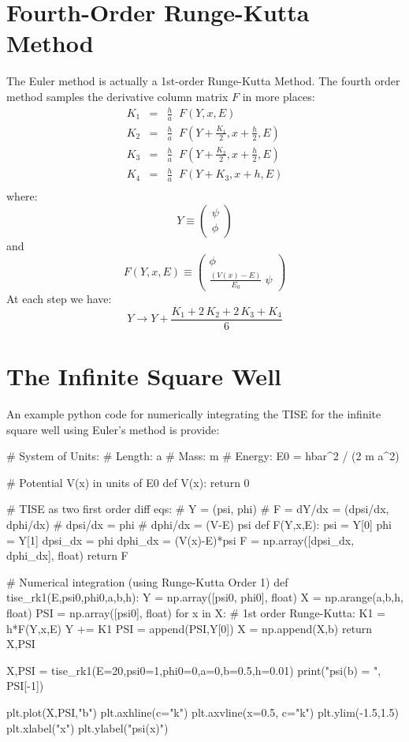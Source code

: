 \documentclass[12pt]{article}
\begin{document}
\section{Fourth-Order Runge-Kutta Method}
The Euler method is actually a 1st-order Runge-Kutta Method.  The fourth order method samples the derivative column matrix $F$ in more places:
\begin{eqnarray*}
K_1 &=& \frac{h}{a} \; \; F(Y, x, E) \\[5pt]
K_2 &=& \frac{h}{a} \; \; F\left(Y + \frac{K_1}{2}, x+\frac{h}{2}, E\right) \\[5pt]
K_3 &=& \frac{h}{a} \; \; F\left(Y + \frac{K_2}{2}, x+\frac{h}{2}, E\right) \\[5pt]
K_4 &=& \frac{h}{a} \; \; F(Y+K_3, x+h, E) \\
\end{eqnarray*}
where:
\begin{equation}
Y \equiv \begin{pmatrix} \psi \\ \phi \end{pmatrix}
\end{equation}
and
\begin{equation}
F(Y,x,E) \equiv \begin{pmatrix} \phi \\ \displaystyle \frac{(V(x)-E)}{E_0}\;\psi \end{pmatrix}
\end{equation}
At each step we have:
$$Y \to Y + \frac{K_1 + 2\,K_2 + 2\, K_3 + K_4}{6}$$

\section{The Infinite Square Well}
An example python code for numerically integrating the TISE for the infinite square well using Euler's method is provide:
\begin{python}
# System of Units:
# Length:  a 
# Mass:    m
# Energy:  E0 = hbar^2 / (2 m a^2)

# Potential V(x) in units of E0
def V(x):
    return 0

# TISE as two first order diff eqs:
# Y = (psi, phi)
# F = dY/dx = (dpsi/dx, dphi/dx)
# dpsi/dx = phi
# dphi/dx = (V-E) psi
def F(Y,x,E):
    psi = Y[0]
    phi = Y[1]
    dpsi_dx = phi
    dphi_dx = (V(x)-E)*psi
    F = np.array([dpsi_dx, dphi_dx], float)
    return F

# Numerical integration (using Runge-Kutta Order 1)
def tise_rk1(E,psi0,phi0,a,b,h):
    Y = np.array([psi0, phi0], float)
    X   = np.arange(a,b,h, float)
    PSI = np.array([psi0], float)
    for x in X:
        # 1st order Runge-Kutta:
        K1 = h*F(Y,x,E)
        Y += K1
        PSI = append(PSI,Y[0])
    X = np.append(X,b)
    return X,PSI

X,PSI = tise_rk1(E=20,psi0=1,phi0=0,a=0,b=0.5,h=0.01)
print("psi(b) = ", PSI[-1])

plt.plot(X,PSI,"b")
plt.axhline(c="k")
plt.axvline(x=0.5, c="k")
plt.ylim(-1.5,1.5)
plt.xlabel("x")
plt.ylabel("psi(x)")
\end{python}
\end{document}
